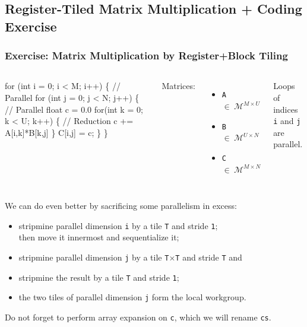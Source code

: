 \documentclass{beamer}
\newcommand{\emp}[1]{\textcolor{DikuRed}{ #1}}
\newcommand{\emphh}[1]{\textcolor{CosGreen}{ #1}}
\begin{document}
\subsection{Register-Tiled Matrix Multiplication + Coding Exercise}

\begin{frame}[fragile,t]
  \frametitle{Exercise: Matrix Multiplication by Register+Block Tiling}

\begin{columns}
\begin{colorcode}[fontsize=\scriptsize]
for (int i = 0; i < M; i++) \{  \emphh{// Parallel}
  for (int j = 0; j < N; j++) \{  \emphh{// Parallel}
    float c = 0.0
    for(int k = 0; k < U; k++) \{ \emp{// Reduction}
      c += A[i,k]*B[k,j] 
    \}
    C[i,j] = c;          
  \}
\}
\end{colorcode}
Matrices:
\begin{itemize}
    \item {\tt A $\in~\mathcal{M}^{M \times U}$}
    \item {\tt B $\in~\mathcal{M}^{U \times N}$}
    \item {\tt C$\in~\mathcal{M}^{M \times N}$} 
\end{itemize}
Loops of indices {\tt i} and {\tt j} are parallel.
\end{columns}

\bigskip

We can do even better by sacrificing some parallelism in excess:
\begin{itemize}
    \item stripmine parallel dimension {\tt i} by a tile {\tt T} and stride {\tt 1};\\
          then move it innermost and sequentialize it;
    \item stripmine parallel dimension {\tt j} by a tile {\tt T$\times$T} and stride {\tt T} and
    \item stripmine the result by a tile {\tt T} and stride {\tt 1};
    \item the two tiles of parallel dimension {\tt j} form the local workgroup.
\end{itemize}

Do not forget to perform array expansion on {\tt c}, which we will rename {\tt cs}.
\end{frame}
\end{document}
